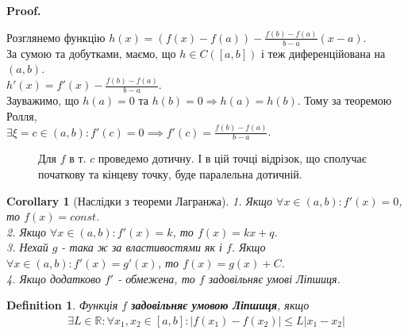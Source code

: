 \documentclass[a4paper, 14pt]{article}
\makeatletter
\def\huge{\displaystyle}
\def\qed{$\blacksquare$}
\theoremstyle{theoremdd}
\theoremstyle{theoremdd}
\newtheorem{definition}[theorem]{Definition}
\theoremstyle{theoremdd}
\theoremstyle{theoremdd}
\theoremstyle{theoremdd}
\theoremstyle{theoremdd}
\theoremstyle{theoremdd}
\theoremstyle{theoremdd}
\newtheorem{corollary}[theorem]{Corollary}
\renewenvironment{proof}[1][Proof.\\]{\par
\pushQED{\hfill \qed}%
\normalfont \topsep6\p@\@plus6\p@\relax
\trivlist
\item\relax
{\bfseries
#1\@addpunct{.}}\hspace\labelsep\ignorespaces
}{%
\popQED\endtrivlist\@endpefalse
}
\makeatother
\begin{document}
\begin{proof}
Розглянемо функцію $h(x) = \huge (f(x)-f(a))- \frac{f(b)-f(a)}{b-a}(x-a)$.\\
За сумою та добутками, маємо, що $h \in C([a,b])$ і теж диференційована на $(a,b)$.\\
$h'(x) = \huge f'(x) - \frac{f(b)-f(a)}{b-a}$.\\
Зауважимо, що $h(a) = 0$ та $h(b) = 0 \Rightarrow h(a) = h(b)$. Тому за теоремою Ролля, \\
$\exists \xi = c \in (a,b): f'(c) = 0 \implies f'(c) = \huge \frac{f(b)-f(a)}{b-a}$.
\end{proof}

\begin{figure}[H]
\centering
{}
\caption*{Для $f$ в т. $c$ проведемо дотичну. І в цій точці відрізок, що сполучає початкову та кінцеву точку, буде паралельна дотичній.}
\end{figure}

\begin{corollary}[Наслідки з теореми Лагранжа]
1. Якщо $\forall x \in (a,b): f'(x) = 0$, то $f(x) = const$.\\
2. Якщо $\forall x \in (a,b): f'(x) = k$, то $f(x) = kx + q$.\\
3. Нехай $g$ - така ж за властивостями як і $f$. Якщо $\forall x \in (a,b): f'(x) = g'(x)$, то $f(x) = g(x) + C$.\\
4. Якщо додатково $f'$ - обмежена, то $f$ задовільняє умові Ліпшиця.
\end{corollary}

\begin{definition}
Функція $f$ \textbf{задовільняє умовою Ліпшиця}, якщо
\begin{align*}
\exists L \in \mathbb{R}: \forall x_1,x_2 \in [a,b]: |f(x_1)-f(x_2)| \leq L|x_1-x_2|
\end{align*}
\end{definition}
\end{document}
